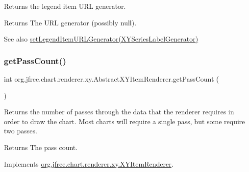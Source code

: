 Returns the legend item U\+RL generator.

\begin{DoxyReturn}{Returns}
The U\+RL generator (possibly {\ttfamily null}).
\end{DoxyReturn}
\begin{DoxySeeAlso}{See also}
\mbox{\hyperlink{classorg_1_1jfree_1_1chart_1_1renderer_1_1xy_1_1_abstract_x_y_item_renderer_a237e75eddcc381facaf8f3e3b322098b}{set\+Legend\+Item\+U\+R\+L\+Generator(\+X\+Y\+Series\+Label\+Generator)}} 
\end{DoxySeeAlso}
\mbox{\label{classorg_1_1jfree_1_1chart_1_1renderer_1_1xy_1_1_abstract_x_y_item_renderer_a9b42eebf833856cc8d92f6aa968e93e7}} 
\subsubsection{\texorpdfstring{get\+Pass\+Count()}{getPassCount()}}
{\footnotesize\ttfamily int org.\+jfree.\+chart.\+renderer.\+xy.\+Abstract\+X\+Y\+Item\+Renderer.\+get\+Pass\+Count (\begin{DoxyParamCaption}{ }\end{DoxyParamCaption})}

Returns the number of passes through the data that the renderer requires in order to draw the chart. Most charts will require a single pass, but some require two passes.

\begin{DoxyReturn}{Returns}
The pass count. 
\end{DoxyReturn}


Implements \mbox{\hyperlink{interfaceorg_1_1jfree_1_1chart_1_1renderer_1_1xy_1_1_x_y_item_renderer_afe42489776da2a4c7e64838382bbaea1}{org.\+jfree.\+chart.\+renderer.\+xy.\+X\+Y\+Item\+Renderer}}.

\mbox{\label{classorg_1_1jfree_1_1chart_1_1renderer_1_1xy_1_1_abstract_x_y_item_renderer_a1392aa3430b50260aecc9e0622c214c3}} 
